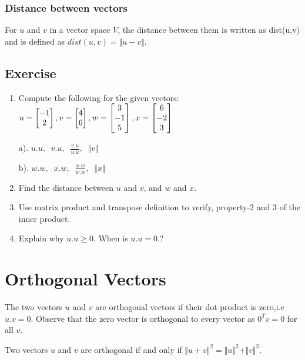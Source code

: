 \documentclass[aima104_lecturenotes_ku.tex]{subfiles}
\begin{document}
\subsubsection{Distance between vectors}
For $u$ and $v$ in a vector space $V$, the distance between them is written as dist(u,v) and is defined as $dist(u,v) = \Vert u-v \Vert$.

\subsection{Exercise}
\begin{enumerate}
\item Compute the following for the given vectors: \\
  $u=
  \begin{bmatrix}
    -1 \\ 2
  \end{bmatrix}, \vspace{4mm}
   v=
   \begin{bmatrix}
     4 \\6
   \end{bmatrix},
   \vspace{5mm}
   w=
   \begin{bmatrix}
     3 \\ -1 \\ 5
   \end{bmatrix},\vspace{4mm}
   x=
   \begin{bmatrix}
     6 \\ -2 \\3
   \end{bmatrix}
   $
   \begin{multicols}{2}
     a). $\displaystyle u.u, \;\; v.u, \;\; \frac{v.u}{u.u}, \;\; \Vert v \Vert $
     \columnbreak

     b). $\displaystyle w.w, \;\; x.w, \;\; \frac{x.w}{w.w}, \;\; \Vert x \Vert$
   \end{multicols}
 \item Find the distance between $u$ and $v$, and $w$ and $x$.
 \item Use matrix product and transpose definition to verify, property-2 and 3 of the inner product.
 \item Explain why $u.u \geq 0$. When is $u.u =0$.?
\end{enumerate}

\section{Orthogonal Vectors}
The two vectors $u$ and $v$ are orthogonal vectors if their dot product is zero,i.e $u.v = 0$. Observe that the zero vector is orthogonal to every vector as $0^Tv=0$ for all $v$.
\begin{thm}
  Two vectors $u$ and $v$ are orthogonal if and only if $\Vert u + v \Vert ^2 = \Vert u \Vert ^2 + \Vert v \Vert ^2$.
\end{thm}
\end{document}
